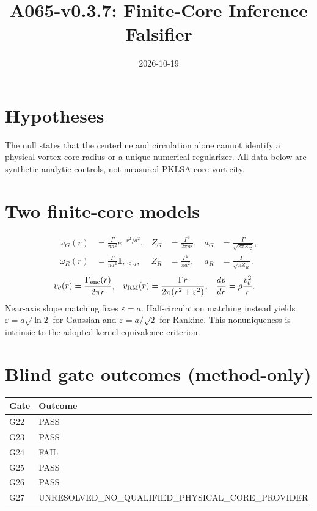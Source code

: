 \documentclass[11pt,a4paper]{article}
\title{A065-v0.3.7: Finite-Core Inference Falsifier}
\date{2026-10-19}
\begin{document}
\maketitle
\section{Hypotheses}
The null states that the centerline and circulation alone cannot identify a physical vortex-core radius or a unique numerical regularizer. All data below are synthetic analytic controls, not measured PKLSA core-vorticity.
\section{Two finite-core models}
\begin{align}
\omega_G(r)&=\frac{\Gamma}{\pi a^2}e^{-r^2/a^2}, & Z_G&=\frac{\Gamma^2}{2\pi a^2}, & a_G&=\frac{\Gamma}{\sqrt{2\pi Z_G}},\\
\omega_R(r)&=\frac{\Gamma}{\pi a^2}\mathbf 1_{r\le a}, & Z_R&=\frac{\Gamma^2}{\pi a^2}, & a_R&=\frac{\Gamma}{\sqrt{\pi Z_R}}.\end{align}
\begin{align}
 v_\theta(r)&=\frac{\Gamma_{\rm enc}(r)}{2\pi r}, &v_{\rm RM}(r)&=\frac{\Gamma r}{2\pi(r^2+\varepsilon^2)}, &\frac{dp}{dr}&=\rho\frac{v_\theta^2}{r}.
\end{align}
Near-axis slope matching fixes $\varepsilon=a$. Half-circulation matching instead yields $\varepsilon=a\sqrt{\ln2}$ for Gaussian and $\varepsilon=a/\sqrt2$ for Rankine. This nonuniqueness is intrinsic to the adopted kernel-equivalence criterion.
\section{Blind gate outcomes (method-only)}
\begin{center}\begin{tabular}{ll}\toprule Gate & Outcome \\\midrule
G22 & PASS \\
G23 & PASS \\
G24 & FAIL \\
G25 & PASS \\
G26 & PASS \\
G27 & UNRESOLVED\_NO\_QUALIFIED\_PHYSICAL\_CORE\_PROVIDER \\
\bottomrule\end{tabular}\end{center}
\end{document}
